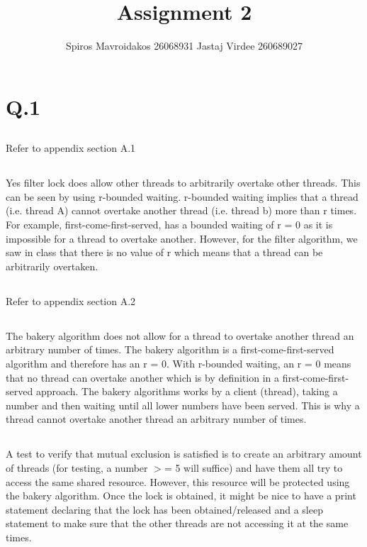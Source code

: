 \documentclass[11pt]{article}
\title{Assignment 2}
\author{Spiros Mavroidakos 26068931 Jastaj Virdee 260689027}
\begin{document}
\maketitle

\section {Q.1}
\subsection{}
Refer to appendix section A.1

\subsection {}
Yes filter lock does allow other threads to arbitrarily overtake other threads. 
This can be seen by using r-bounded waiting. r-bounded waiting implies that a thread 
(i.e. thread A) cannot overtake another thread (i.e. thread b) more than r times. 
For example, first-come-first-served, has a bounded waiting of r = 0 as it is impossible 
for a thread to overtake another. However, for the filter algorithm, we saw in class that 
there is no value of r which means that a thread can be arbitrarily overtaken.

\subsection {}
Refer to appendix section A.2

\subsection {}
The bakery algorithm does not allow for a thread to overtake another thread an arbitrary number
of times. The bakery algorithm is a first-come-first-served algorithm and therefore has an r = 
0. With r-bounded waiting, an r = 0 means that no thread can overtake another which is by 
definition in a first-come-first-served approach. The bakery algorithms works by a client 
(thread), taking a number and then waiting until all lower numbers have been served. 
This is why a thread cannot overtake another thread an arbitrary number of times.

\subsection {}
A test to verify that mutual exclusion is satisfied is to create an arbitrary amount of 
threads (for testing, a number $>$= 5 will suffice) and have them all try to access the same 
shared resource. However, this resource will be protected using the bakery algorithm. Once 
the lock is obtained, it might be nice to have a print statement declaring that the lock has 
been obtained/released and a sleep statement to make sure that the other threads are not 
accessing it at the same times.
\end{document}
